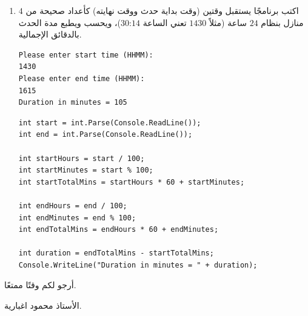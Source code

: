 \documentclass[14pt]{extarticle}
\begin{document}
\begin{enumerate}[itemsep=2em]
\item
اكتب برنامجًا يستقبل وقتين (وقت بداية حدث ووقت نهايته) كأعداد صحيحة من $4$ منازل بنظام $24$ ساعة (مثلاً $1430$ تعني الساعة $14$:$30$)، ويحسب ويطبع مدة الحدث بالدقائق الإجمالية.
\ifdetailed
\begin{boxExample}
\begin{english}
\begin{verbatim}
Please enter start time (HHMM):
1430
Please enter end time (HHMM):
1615
Duration in minutes = 105
\end{verbatim}
\end{english}
\end{boxExample}
\fi
\ifwithsols
\begin{boxSolution}
\begin{english}
\begin{verbatim}
int start = int.Parse(Console.ReadLine());
int end = int.Parse(Console.ReadLine());

int startHours = start / 100;
int startMinutes = start % 100;
int startTotalMins = startHours * 60 + startMinutes;

int endHours = end / 100;
int endMinutes = end % 100;
int endTotalMins = endHours * 60 + endMinutes;

int duration = endTotalMins - startTotalMins;
Console.WriteLine("Duration in minutes = " + duration);
\end{verbatim}
\end{english}
\end{boxSolution}
\fi
\filbreak

\end{enumerate}

\vspace{1cm}
\begin{flushleft}
أرجو لكم وقتًا ممتعًا.

الأستاذ محمود اغبارية.
\end{flushleft}
\end{document}
